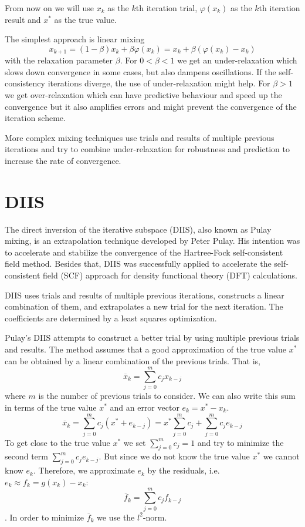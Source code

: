 From now on we will use $x_k$ as the $k$th iteration trial, $\varphi(x_k)$ as the $k$th iteration result and $x^\ast$ as the true value.

The simplest approach is linear mixing
\begin{equation} \label{eq:linmix}
x_{k+1} = (1-\beta) x_k + \beta \varphi(x_k) = x_k + \beta (\varphi(x_k) - x_k)
\end{equation}
with the relaxation parameter \(\beta\).
For \(0 < \beta < 1\) we get an under-relaxation which slows down convergence in some cases, but also dampens oscillations. If the self-consistency iterations diverge, the use of under-relaxation might help.
For \(\beta > 1\) we get over-relaxation which can have predictive behaviour and speed up the convergence but it also amplifies errors and might prevent the convergence of the iteration scheme.

More complex mixing techniques use trials and results of multiple previous iterations and try to combine under-relaxation for robustness and prediction to increase the rate of convergence\cite{anderson_mixing}.

\section{DIIS}
The direct inversion of the iterative subspace (DIIS), also known as Pulay mixing, is an extrapolation technique developed by Peter Pulay\cite{diis_pulay1}\cite{diis_pulay2}. His intention was to accelerate and stabilize the convergence of the Hartree-Fock self-consistent field method. Besides that, DIIS was successfully applied to accelerate the self-consistent field (SCF) approach for density functional theory (DFT) calculations.\cite{diis_restarted}

DIIS uses trials and results of multiple previous iterations, constructs a linear combination of them, and extrapolates a new trial for the next iteration. The coefficients are determined by a least squares optimization.

Pulay's DIIS attempts to construct a better trial by using multiple previous trials and results. The method assumes that a good approximation of the true value \(x^\ast\) can be obtained by a linear combination of the previous trials. That is,
\begin{equation} \label{eq:diis_x}
\overline{x}_{k} = \sum_{j=0}^{m} c_j x_{k-j}
\end{equation}
where \(m\) is the number of previous trials to consider. We can also write this sum in terms of the true value \(x^\ast\) and an error vector \(e_{k} = x^\ast - x_{k}\).
\[\overline{x}_{k} = \sum_{j=0}^{m} c_j (x^\ast + e_{k-j}) = x^\ast \sum_{j=0}^{m} c_j + \sum_{j=0}^{m} c_j e_{k-j}\]
To get close to the true value \(x^\ast\) we set \(\sum_{j=0}^{m} c_j = 1\) and try to minimize the second term \(\sum_{j=0}^{m} c_j e_{k-j}\). But since we do not know the true value \(x^\ast\) we cannot know \(e_{k}\). Therefore, we approximate \(e_{k}\) by the residuals, i.e. \(e_{k} \approx f_{k} = g(x_k) - x_k\):
\[\overline{f}_{k} = \sum_{j=0}^{m} c_j f_{k-j}\].
In order to minimize \(\overline{f}_{k}\) we use the \(l^2\)-norm.

